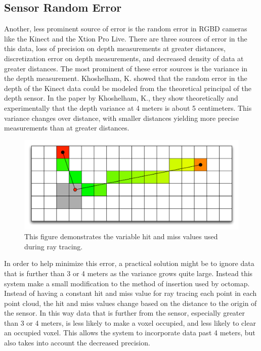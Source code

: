 \documentclass[12pt]{report}
\begin{document}
\subsection{Sensor Random Error}
Another, less prominent source of error is the random error in RGBD cameras like the Kinect and the Xtion Pro Live.  There are three sources of error in the this data, loss of precision on depth measurements at greater distances, discretization error on depth measurements, and decreased density of data at greater distances.  The most prominent of these error sources is the variance in the depth measurement.  Khoshelham, K. showed that the random error in the depth of the Kinect data could be modeled from the theoretical principal of the depth sensor\cite{khoshelham2011accuracy}.  In the paper by Khoshelham, K., they show theoretically and experimentally that the depth variance at 4 meters is about 5 centimeters.  This variance changes over distance, with smaller distances yielding more precise measurements than at greater distances.

\begin{figure}[ht]
  \centering
  \includegraphics[width=6in,keepaspectratio]{variable_hit_miss.pdf}
  \caption{This figure demonstrates the variable hit and miss values used during ray tracing.}
  \label{fig:variable_hit_miss}
\end{figure}

In order to help minimize this error, a practical solution might be to ignore data that is further than 3 or 4 meters as the variance grows quite large.  Instead this system make a small modification to the method of insertion used by octomap.  Instead of having a constant hit and miss value for ray tracing each point in each point cloud, the hit and miss values change based on the distance to the origin of the sensor.  In this way data that is further from the sensor, especially greater than 3 or 4 meters, is less likely to make a voxel occupied, and less likely to clear an occupied voxel.  This allows the system to incorporate data past 4 meters, but also takes into account the decreased precision.
\end{document}
